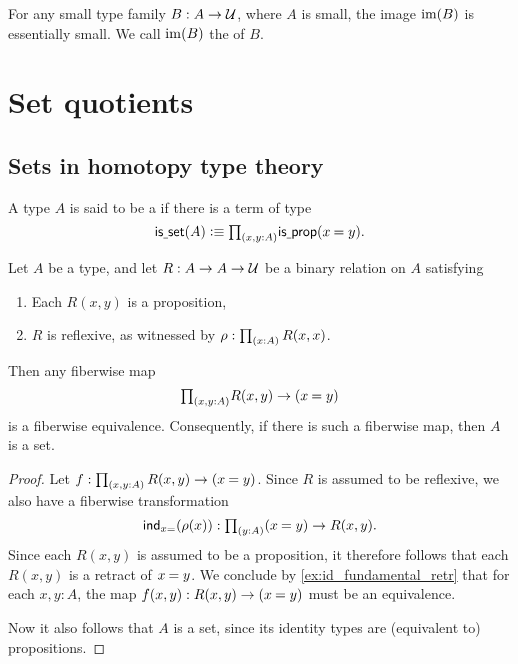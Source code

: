 \begin{cor}\label{cor:im_small}
For any small type family $B:A\to\mathcal{U}$, where $A$ is small, the image $\operatorname{im}(B)$ is essentially small. We call $\operatorname{im}(B)$ the  of $B$. 
\end{cor}

\section{Set quotients}

\subsection{Sets in homotopy type theory}
\begin{defn}
A type $A$ is said to be a  if there is a term of type
\begin{equation*}
\isset(A)\defeq \prd{x,y:A}\isprop(\id{x}{y}).
\end{equation*}
\end{defn}

\begin{lem}\label{lem:prop_to_id}
Let $A$ be a type, and let $R:A\to A\to\mathcal{U}$ be a binary relation on $A$ satisfying
\begin{enumerate}
\item Each $R(x,y)$ is a proposition,
\item $R$ is reflexive, as witnessed by $\rho:\prd{x:A}R(x,x)$.
\end{enumerate}
Then any fiberwise map
\begin{equation*}
\prd{x,y:A}R(x,y)\to (\id{x}{y})
\end{equation*}
is a fiberwise equivalence. Consequently, if there is such a fiberwise map, then $A$ is a set.
\end{lem}

\begin{proof}
Let $f:\prd{x,y:A}R(x,y)\to(\id{x}{y})$. 
Since $R$ is assumed to be reflexive, we also have a fiberwise transformation
\begin{equation*}
\ind{x{=}}(\rho(x)):\prd{y:A}(\id{x}{y})\to R(x,y).
\end{equation*}
Since each $R(x,y)$ is assumed to be a proposition, it therefore follows that each $R(x,y)$ is a retract of $\id{x}{y}$. We conclude by \autoref{ex:id_fundamental_retr} that for each $x,y:A$, the map $f(x,y):R(x,y)\to(\id{x}{y})$ must be an equivalence.

Now it also follows that $A$ is a set, since its identity types are (equivalent to) propositions.
\end{proof}

